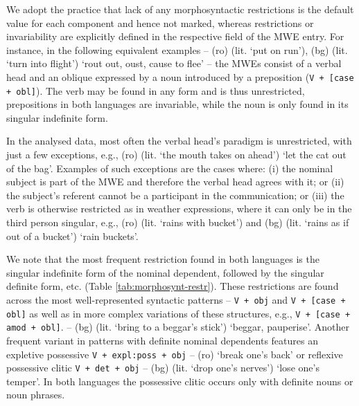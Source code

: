 \documentclass[output=paper,colorlinks,citecolor=brown]{langscibook}
\begin{document}
We adopt the practice that lack of any morphosyntactic restrictions is the default value for each component and hence not marked, whereas restrictions or invariability are explicitly defined in the respective field of the MWE entry. For instance, in the following equivalent examples -- (ro)  (lit. `put on run'), (bg)  (lit. `turn into flight') {`rout out, oust, cause to flee'} -- the MWEs consist of a verbal head and an oblique expressed by a noun introduced by a preposition (\texttt{V + [case + obl]}). The verb may be found in any form and is thus unrestricted, prepositions in both languages are invariable, while the noun is only found in its singular indefinite form. 

In the analysed data, most often the verbal head's paradigm is unrestricted, with just a few exceptions, e.g., (ro)  (lit. `the mouth takes on ahead') {`let the cat out of the bag'}. Examples of such exceptions are the cases where: (i) the nominal subject is part of the MWE and therefore the verbal head agrees with it; or (ii) the subject's referent cannot be a participant in the communication; or (iii) the verb is otherwise restricted as in weather expressions, where it can only be in the third person singular, e.g., (ro)  (lit. `rains with bucket') and (bg)  (lit. `rains as if out of a bucket') {`rain buckets'}.\largerpage

We note that the most frequent restriction found in both languages is the singular indefinite form of the nominal dependent, followed by the singular definite form, etc. (Table \ref{tab:morphosynt-restr}). These restrictions are found across the most well-represented syntactic patterns -- \texttt{V + obj} and \texttt{V + [case + obl]} as well as in more complex variations of these structures, e.g.,  \texttt{V + [case + amod + obl]}. -- (bg)  (lit. `bring to a beggar's stick') %
{`beggar, pauperise'}. 
Another frequent variant in patterns with definite nominal dependents features an expletive possessive \texttt{V + expl:poss + obj} -- (ro)  {`break one's back'} or reflexive possessive clitic \texttt{V + det + obj} -- (bg)  (lit. `drop one's nerves') {`lose one's temper'}. 
In both languages the possessive clitic occurs only with definite nouns or noun phrases.
\end{document}
